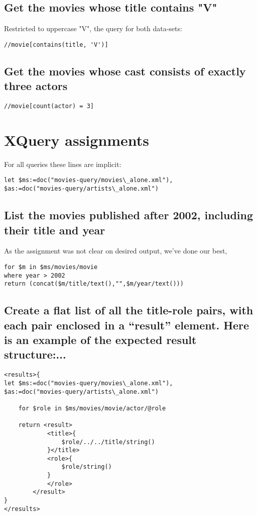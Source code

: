 \documentclass{article}
\begin{document}
\subsection{Get the movies whose title contains "V"}
Restricted to uppercase "V", the query for both data-sets:
\begin{verbatim}
//movie[contains(title, 'V')]
\end{verbatim}

\subsection{Get the movies whose cast consists of exactly three actors}
\begin{verbatim}
//movie[count(actor) = 3]
\end{verbatim}

\section{XQuery assignments}
For all queries these lines are implicit:
\begin{verbatim}
let $ms:=doc("movies-query/movies\_alone.xml"),
$as:=doc("movies-query/artists\_alone.xml")
\end{verbatim}
\subsection{List the movies published after 2002, including their
  title and year}
As the assignment was not clear on desired output, we've done our best,

\begin{verbatim}
for $m in $ms/movies/movie 
where year > 2002 
return (concat($m/title/text(),"",$m/year/text()))
\end{verbatim}

\subsection{Create a flat list of all the title-role pairs, with each
  pair enclosed in a “result” element. Here is an example of the
  expected result structure:...}
\begin{verbatim}
<results>{    
let $ms:=doc("movies-query/movies\_alone.xml"),                                                                                           
$as:=doc("movies-query/artists\_alone.xml")

    for $role in $ms/movies/movie/actor/@role

    return <result>
            <title>{
                $role/../../title/string()
            }</title>
            <role>{
                $role/string()
            }
            </role>
        </result>
}
</results>
\end{verbatim}
\end{document}
